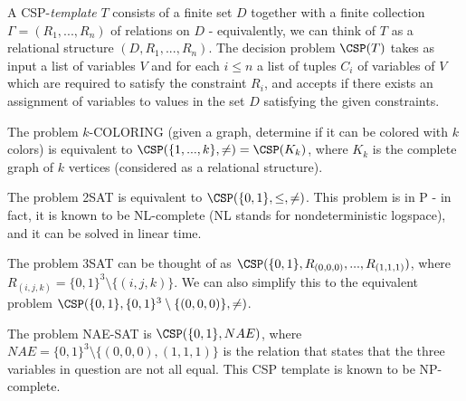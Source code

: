 \begin{defn} A CSP-\emph{template} $T$ consists of a finite set $D$ together with a finite collection $\Gamma = (R_1, ..., R_n)$ of relations on $D$ - equivalently, we can think of $T$ as a relational structure $(D, R_1, ..., R_n)$. The decision problem $\CSP(T)$ takes as input a list of variables $V$ and for each $i \le n$ a list of tuples $C_i$ of variables of $V$ which are required to satisfy the constraint $R_i$, and accepts if there exists an assignment of variables to values in the set $D$ satisfying the given constraints.%
\end{defn}

\begin{comment}
\begin{thm}[Feder, Vardi \cite{feder-vardi}] Every problem in MMSNP is equivalent under randomized polynomial time reductions to a CSP, and vice versa.
\end{thm}

Having justified restricting our studies to CSPs, we now give some examples of particularly famous CSP templates.
\end{comment}

\begin{ex} The problem $k$-COLORING (given a graph, determine if it can be colored with $k$ colors) is equivalent to $\CSP(\{1, ..., k\}, \ne) = \CSP(K_k)$, where $K_k$ is the complete graph of $k$ vertices (considered as a relational structure).
\end{ex}

\begin{ex} The problem 2SAT is equivalent to $\CSP(\{0,1\}, \le, \ne)$. This problem is in P - in fact, it is known to be NL-complete (NL stands for nondeterministic logspace), and it can be solved in linear time.
\end{ex}

\begin{ex} The problem 3SAT can be thought of as $\CSP(\{0,1\}, R_{(0,0,0)}, ..., R_{(1,1,1)})$, where $R_{(i,j,k)} = \{0,1\}^3 \setminus \{(i,j,k)\}$. We can also simplify this to the equivalent problem $\CSP(\{0,1\}, \{0,1\}^3\setminus\{(0,0,0)\}, \ne)$.
\end{ex}

\begin{ex} The problem NAE-SAT is $\CSP(\{0,1\}, NAE)$, where $NAE = \{0,1\}^3 \setminus \{(0,0,0), (1,1,1)\}$ is the relation that states that the three variables in question are not all equal. This CSP template is known to be NP-complete.
\end{ex}

